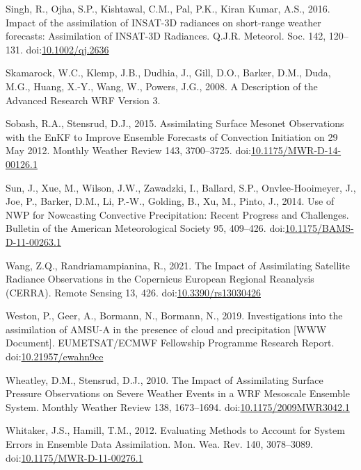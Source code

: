 \documentclass[final,5p,times,twocolumn,authoryear]{elsarticle} %
\begin{document}
\leavevmode\hypertarget{ref-singh2016}{}%
Singh, R., Ojha, S.P., Kishtawal, C.M., Pal, P.K., Kiran Kumar, A.S., 2016. Impact of the assimilation of INSAT-3D radiances on short-range weather forecasts: Assimilation of INSAT-3D Radiances. Q.J.R. Meteorol. Soc. 142, 120--131. doi:\href{https://doi.org/10.1002/qj.2636}{10.1002/qj.2636}

\leavevmode\hypertarget{ref-skamarock2008}{}%
Skamarock, W.C., Klemp, J.B., Dudhia, J., Gill, D.O., Barker, D.M., Duda, M.G., Huang, X.-Y., Wang, W., Powers, J.G., 2008. A Description of the Advanced Research WRF Version 3.

\leavevmode\hypertarget{ref-sobash2015}{}%
Sobash, R.A., Stensrud, D.J., 2015. Assimilating Surface Mesonet Observations with the EnKF to Improve Ensemble Forecasts of Convection Initiation on 29 May 2012. Monthly Weather Review 143, 3700--3725. doi:\href{https://doi.org/10.1175/MWR-D-14-00126.1}{10.1175/MWR-D-14-00126.1}

\leavevmode\hypertarget{ref-sun2014}{}%
Sun, J., Xue, M., Wilson, J.W., Zawadzki, I., Ballard, S.P., Onvlee-Hooimeyer, J., Joe, P., Barker, D.M., Li, P.-W., Golding, B., Xu, M., Pinto, J., 2014. Use of NWP for Nowcasting Convective Precipitation: Recent Progress and Challenges. Bulletin of the American Meteorological Society 95, 409--426. doi:\href{https://doi.org/10.1175/BAMS-D-11-00263.1}{10.1175/BAMS-D-11-00263.1}

\leavevmode\hypertarget{ref-wang2021}{}%
Wang, Z.Q., Randriamampianina, R., 2021. The Impact of Assimilating Satellite Radiance Observations in the Copernicus European Regional Reanalysis (CERRA). Remote Sensing 13, 426. doi:\href{https://doi.org/10.3390/rs13030426}{10.3390/rs13030426}

\leavevmode\hypertarget{ref-weston2019}{}%
Weston, P., Geer, A., Bormann, N., Bormann, N., 2019. Investigations into the assimilation of AMSU-A in the presence of cloud and precipitation {[}WWW Document{]}. EUMETSAT/ECMWF Fellowship Programme Research Report. doi:\href{https://doi.org/10.21957/ewahn9ce}{10.21957/ewahn9ce}

\leavevmode\hypertarget{ref-wheatley2010}{}%
Wheatley, D.M., Stensrud, D.J., 2010. The Impact of Assimilating Surface Pressure Observations on Severe Weather Events in a WRF Mesoscale Ensemble System. Monthly Weather Review 138, 1673--1694. doi:\href{https://doi.org/10.1175/2009MWR3042.1}{10.1175/2009MWR3042.1}

\leavevmode\hypertarget{ref-whitaker2012}{}%
Whitaker, J.S., Hamill, T.M., 2012. Evaluating Methods to Account for System Errors in Ensemble Data Assimilation. Mon. Wea. Rev. 140, 3078--3089. doi:\href{https://doi.org/10.1175/MWR-D-11-00276.1}{10.1175/MWR-D-11-00276.1}
\end{document}
